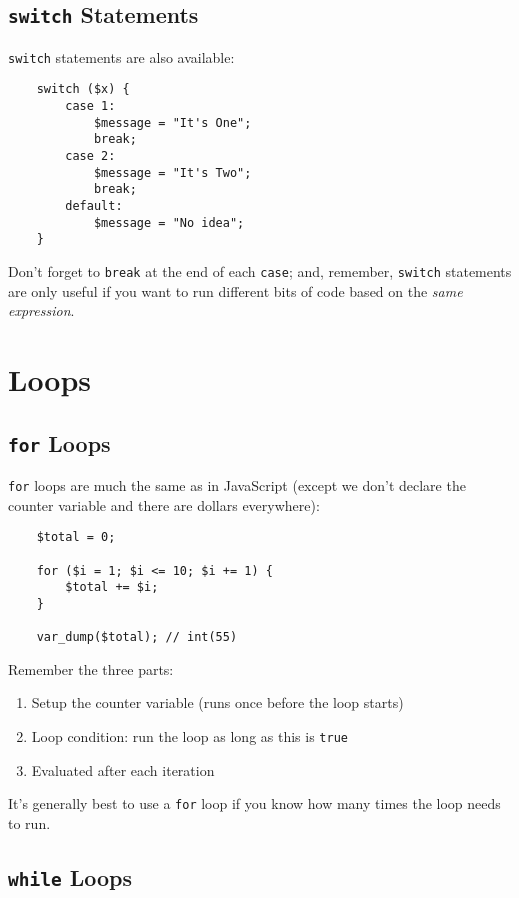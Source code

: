 \subsection{\texttt{switch} Statements}

\texttt{switch} statements are also available:

\begin{verbatim}
    switch ($x) {
        case 1:
            $message = "It's One";
            break;
        case 2:
            $message = "It's Two";
            break;
        default:
            $message = "No idea";
    }
\end{verbatim}

Don't forget to \texttt{break} at the end of each \texttt{case}; and, remember, \texttt{switch} statements are only useful if you want to run different bits of code based on the \textit{same expression}.


\section{Loops}

\subsection{\texttt{for} Loops}

\texttt{for} loops are much the same as in JavaScript (except we don't declare the counter variable and there are dollars everywhere):

\begin{verbatim}
    $total = 0;

    for ($i = 1; $i <= 10; $i += 1) {
        $total += $i;
    }

    var_dump($total); // int(55)
\end{verbatim}

Remember the three parts:

\begin{enumerate}
    \item Setup the counter variable (runs once before the loop starts)
    \item Loop condition: run the loop as long as this is \texttt{true}
    \item Evaluated after each iteration
\end{enumerate}

It's generally best to use a \texttt{for} loop if you know how many times the loop needs to run.

\subsection{\texttt{while} Loops}

